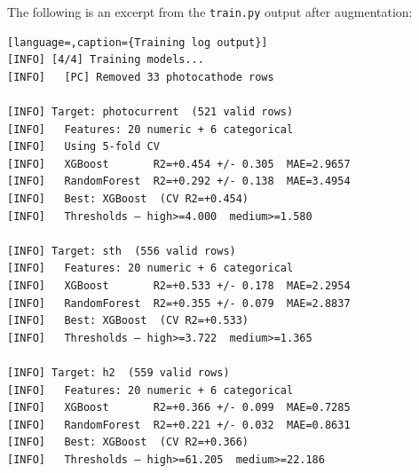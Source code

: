 The following is an excerpt from the \texttt{train.py} output after augmentation:

\begin{lstlisting}[language=,caption={Training log output}]
[INFO] [4/4] Training models...
[INFO]   [PC] Removed 33 photocathode rows

[INFO] Target: photocurrent  (521 valid rows)
[INFO]   Features: 20 numeric + 6 categorical
[INFO]   Using 5-fold CV
[INFO]   XGBoost       R2=+0.454 +/- 0.305  MAE=2.9657
[INFO]   RandomForest  R2=+0.292 +/- 0.138  MAE=3.4954
[INFO]   Best: XGBoost  (CV R2=+0.454)
[INFO]   Thresholds — high>=4.000  medium>=1.580

[INFO] Target: sth  (556 valid rows)
[INFO]   Features: 20 numeric + 6 categorical
[INFO]   XGBoost       R2=+0.533 +/- 0.178  MAE=2.2954
[INFO]   RandomForest  R2=+0.355 +/- 0.079  MAE=2.8837
[INFO]   Best: XGBoost  (CV R2=+0.533)
[INFO]   Thresholds — high>=3.722  medium>=1.365

[INFO] Target: h2  (559 valid rows)
[INFO]   Features: 20 numeric + 6 categorical
[INFO]   XGBoost       R2=+0.366 +/- 0.099  MAE=0.7285
[INFO]   RandomForest  R2=+0.221 +/- 0.032  MAE=0.8631
[INFO]   Best: XGBoost  (CV R2=+0.366)
[INFO]   Thresholds — high>=61.205  medium>=22.186
\end{lstlisting}
